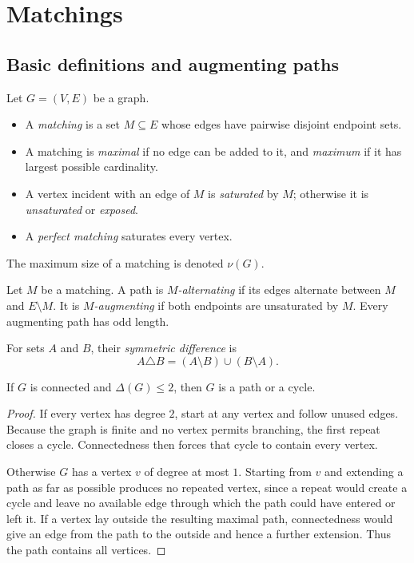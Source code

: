 \chapter{Matchings}

\section{Basic definitions and augmenting paths}

\begin{notedefinition}
Let $G=(V,E)$ be a graph.
\begin{itemize}
  \item A \emph{matching} is a set $M\subseteq E$ whose edges have pairwise
        disjoint endpoint sets.
  \item A matching is \emph{maximal} if no edge can be added to it, and
        \emph{maximum} if it has largest possible cardinality.
  \item A vertex incident with an edge of $M$ is \emph{saturated} by $M$;
        otherwise it is \emph{unsaturated} or \emph{exposed}.
  \item A \emph{perfect matching} saturates every vertex.
\end{itemize}
The maximum size of a matching is denoted $\nu(G)$.
\end{notedefinition}

\begin{notedefinition}
Let $M$ be a matching.  A path is \emph{$M$-alternating} if its edges
alternate between $M$ and $E\setminus M$.  It is \emph{$M$-augmenting} if
both endpoints are unsaturated by $M$.  Every augmenting path has odd length.
\end{notedefinition}

\begin{notedefinition}
For sets $A$ and $B$, their \emph{symmetric difference} is
\[
  A\triangle B=(A\setminus B)\cup(B\setminus A).
\]
\end{notedefinition}
\begin{notetheorem}
If $G$ is connected and $\Delta(G)\le2$, then $G$ is a path or a cycle.
\end{notetheorem}
\begin{proof}
If every vertex has degree $2$, start at any vertex and follow unused edges.
Because the graph is finite and no vertex permits branching, the first repeat
closes a cycle.  Connectedness then forces that cycle to contain every vertex.

Otherwise $G$ has a vertex $v$ of degree at most $1$.  Starting from $v$ and
extending a path as far as possible produces no repeated vertex, since a repeat
would create a cycle and leave no available edge through which the path could
have entered or left it.  If a vertex lay outside the resulting maximal path,
connectedness would give an edge from the path to the outside and hence a
further extension.  Thus the path contains all vertices.
\end{proof}

